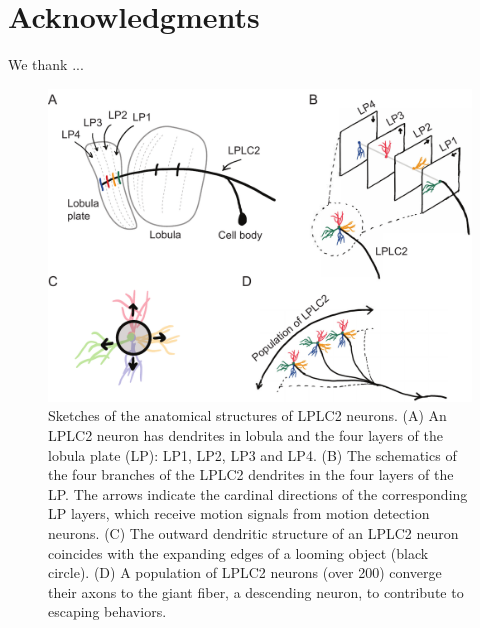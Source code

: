 \documentclass[pdftex,9pt,lineno]{elife}
\begin{document}
\section{Acknowledgments}

We thank ...




\newpage

\begin{figure}
\includegraphics[width=\linewidth]{figures/anatomy_paper.pdf}
\caption{Sketches of the anatomical structures of LPLC2 neurons. (A) An LPLC2 neuron has dendrites in lobula and the four layers of the lobula plate (LP): LP1, LP2, LP3 and LP4. (B) The schematics of the four branches of the LPLC2 dendrites in the four layers of the LP. The arrows indicate the cardinal directions of the corresponding LP layers, which receive motion signals from motion detection neurons. (C) The outward dendritic structure of an LPLC2 neuron coincides with the expanding edges of a looming object (black circle). (D) A population of LPLC2 neurons (over 200) converge their axons to the giant fiber, a descending neuron, to contribute to escaping behaviors.}
\label{fig:anatomy}
\end{figure}
\end{document}
